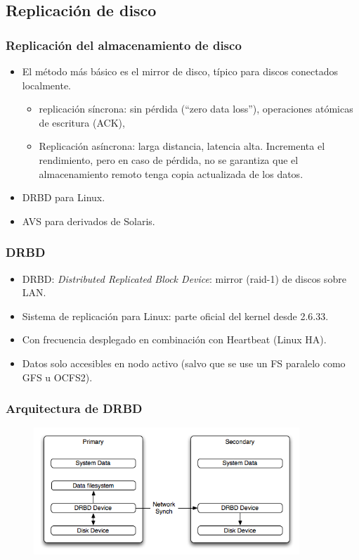 \documentclass{beamer}
\begin{document}
\subsection{Replicación de disco}

\begin{frame}
  \frametitle{Replicación del almacenamiento de disco}
  \begin{itemize}
    \item El método más básico es el \alert{mirror de disco}, típico para discos conectados localmente.
	  \begin{itemize}
	    \item \alert{replicación síncrona:} sin pérdida (``zero data loss''), operaciones atómicas de escritura (ACK),
	    \item \alert{Replicación asíncrona}: larga distancia, latencia alta. Incrementa el rendimiento, pero en caso de pérdida, no se garantiza que el almacenamiento remoto tenga copia actualizada de los datos.
	  \end{itemize}
    \item DRBD para Linux. 
    \item AVS para derivados de Solaris.
  \end{itemize}
\end{frame}

\begin{frame}
  \frametitle{DRBD}
  \begin{itemize}
    \item DRBD: \textit{Distributed Replicated Block Device}: mirror (raid-1) de discos sobre LAN.
    \item Sistema de replicación para Linux: parte oficial del kernel desde 2.6.33.
    \item Con frecuencia desplegado en combinación con Heartbeat (Linux HA).
    \item Datos solo accesibles en nodo activo (salvo que se use un FS paralelo como GFS u OCFS2).

  \end{itemize}
\end{frame}


\begin{frame}
  \frametitle{Arquitectura de DRBD}

\begin{figure}[h]
\begin{center}
  \includegraphics[width=10cm]{figs/drbd-main.png}
\end{center}
\end{figure}

\end{frame}
\end{document}
